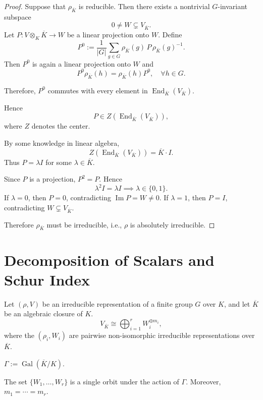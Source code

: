 \begin{proof}
Suppose that \(\rho_{\overline{K}}\) is reducible.
Then there exists a nontrivial \(G\)-invariant subspace
\[
0 \neq W \subsetneq V_{\overline{K}}.
\]
Let \(P: V \otimes_K \overline{K} \to W\) be a linear projection onto \(W\).
Define
\[
P^0 := \frac{1}{|G|} \sum_{g \in G} \rho_{\overline{K}}(g) \, P \, \rho_{\overline{K}}(g)^{-1}.
\]
Then \(P^0\) is again a linear projection onto \(W\) and
\[
P^0 \rho_{\overline{K}}(h) = \rho_{\overline{K}}(h) P^0, \quad \forall h \in G.
\]


Therefore, \(P^0\) commutes with every element in
\(\operatorname{End}_{\overline{K}}(V_{\overline{K}})\).

Hence
\[
P \in Z\left(\operatorname{End}_{\overline{K}}(V_{\overline{K}})\right),
\]
where \(Z\) denotes the center. 

By some knowledge in linear algebra, 
\[
Z\left(\operatorname{End}_{\overline{K}}(V_{\overline{K}})\right)
= \overline{K} \cdot I.
\]
Thus \(P = \lambda I\) for some \(\lambda \in \overline{K}\).

Since \(P\) is a projection, \(P^2 = P\). Hence
\[
\lambda^2 I = \lambda I \implies \lambda \in \{0, 1\}.
\]
If \(\lambda = 0\), then \(P = 0\), contradicting \(\operatorname{Im} P = W \neq 0\).
If \(\lambda = 1\), then \(P = I\), contradicting \(W \subsetneq V_{\overline{K}}\).

Therefore \(\rho_{\overline{K}}\) must be irreducible, i.e., $\rho$ is absolutely irreducible.


\end{proof}


\section{Decomposition of Scalars and Schur Index}

Let \((\rho, V)\) be an irreducible representation of a finite group $G$ over \(K\), and let \(\overline{K}\) be an algebraic closure of $K$. 
\[
V_{\overline{K}} \cong \bigoplus_{i=1}^r W_i^{\oplus m_i},
\]
where the \((\rho_i,W_i)\) are pairwise non-isomorphic irreducible representations over \(\overline{K}\). 


\begin{notation}
\(\Gamma := \operatorname{Gal}(\overline{K}/K)\).

\end{notation}


\begin{lemma}\label{lem:galois_orbit}
The set \(\{W_1, \dots, W_r\}\) is a single orbit under the action of \(\Gamma\). Moreover, \(m_1 = \cdots = m_r\).
\end{lemma}

